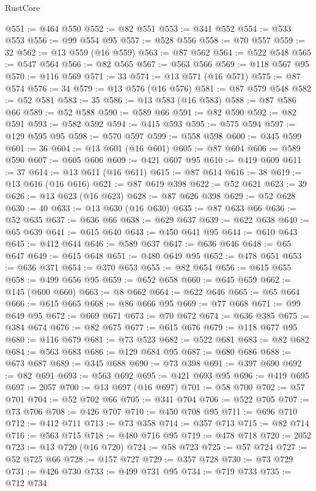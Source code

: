 \begin{lexlean}{RustCore}
\begin{coremodule}
@551 := @464 @550
@552 := @82 @551
@553 := @341 @552
@554 := @533 @553
@556 := @99 @554 @95
@557 := @528 @556
@558 := @70 @557
@559 := 32
@562 := @13 @559 (@16 @559)
@563 := @87 @562
@564 := @522 @548
@565 := @547 @564
@566 := @82 @565
@567 := @563 @566
@569 := @118 @567 @95
@570 := @116 @569
@571 := 33
@574 := @13 @571 (@16 @571)
@575 := @87 @574
@576 := 34
@579 := @13 @576 (@16 @576)
@581 := @87 @579 @548
@582 := @52 @581
@583 := 35
@586 := @13 @583 (@16 @583)
@588 := @87 @586 @66
@589 := @52 @588
@590 := @589 @66
@591 := @82 @590
@592 := @82 @591
@593 := @582 @592
@594 := @415 @593
@595 := @575 @594
@597 := @129 @595 @95
@598 := @570 @597
@599 := @558 @598
@600 := @345 @599
@601 := 36
@604 := @13 @601 (@16 @601)
@605 := @87 @604
@606 := @589 @590
@607 := @605 @606
@609 := @421 @607 @95
@610 := @419 @609
@611 := 37
@614 := @13 @611 (@16 @611)
@615 := @87 @614
@616 := 38
@619 := @13 @616 (@16 @616)
@621 := @87 @619 @398
@622 := @52 @621
@623 := 39
@626 := @13 @623 (@16 @623)
@628 := @87 @626 @398
@629 := @52 @628
@630 := 40
@633 := @13 @630 (@16 @630)
@635 := @87 @633 @66
@636 := @52 @635
@637 := @636 @66
@638 := @629 @637
@639 := @622 @638
@640 := @65 @639
@641 := @615 @640
@643 := @450 @641 @95
@644 := @610 @643
@645 := @412 @644
@646 := @589 @637
@647 := @636 @646
@648 := @65 @647
@649 := @615 @648
@651 := @480 @649 @95
@652 := @478 @651
@653 := @636 @371
@654 := @370 @653
@655 := @82 @654
@656 := @615 @655
@658 := @499 @656 @95
@659 := @652 @658
@660 := @645 @659
@662 := @145 (@600 @660)
@663 := @8 @662
@664 := @622 @646
@665 := @65 @664
@666 := @615 @665
@668 := @86 @666 @95
@669 := @77 @668
@671 := @99 @649 @95
@672 := @669 @671
@673 := @70 @672
@674 := @636 @385
@675 := @384 @674
@676 := @82 @675
@677 := @615 @676
@679 := @118 @677 @95
@680 := @116 @679
@681 := @73 @523
@682 := @522 @681
@683 := @82 @682
@684 := @563 @683
@686 := @129 @684 @95
@687 := @680 @686
@688 := @673 @687
@689 := @345 @688
@690 := @73 @398
@691 := @397 @690
@692 := @82 @691
@693 := @563 @692
@695 := @421 @693 @95
@696 := @419 @695
@697 := 2057
@700 := @13 @697 (@16 @697)
@701 := @58 @700
@702 := @57 @701
@704 := @52 @702 @66
@705 := @341 @704
@706 := @522 @705
@707 := @73 @706
@708 := @426 @707
@710 := @450 @708 @95
@711 := @696 @710
@712 := @412 @711
@713 := @73 @358
@714 := @357 @713
@715 := @82 @714
@716 := @563 @715
@718 := @480 @716 @95
@719 := @478 @718
@720 := 2052
@723 := @13 @720 (@16 @720)
@724 := @58 @723
@725 := @57 @724
@727 := @52 @725 @66
@728 := @157 @727
@729 := @357 @728
@730 := @73 @729
@731 := @426 @730
@733 := @499 @731 @95
@734 := @719 @733
@735 := @712 @734

\end{coremodule}
\end{lexlean}
